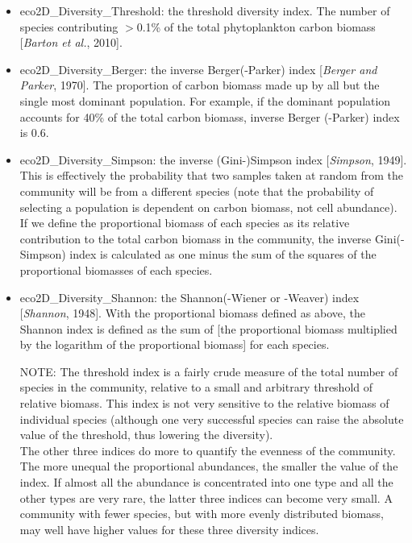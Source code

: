 \documentclass[11pt,fleqn]{book} %
\begin{document}
\begin{itemize}[noitemsep]
\begin{itemize}[noitemsep]
\item \textsf{\small eco2D\_Diversity\_Threshold}: the threshold diversity index. The number of species contributing $>$0.1\% of the total phytoplankton carbon biomass [\textit{Barton et al.}, 2010].
\item \textsf{\small eco2D\_Diversity\_Berger}: the inverse Berger(-Parker) index  [\textit{Berger and Parker}, 1970]. The proportion of carbon biomass made up by all but the single most dominant population. For example, if the dominant population accounts for 40\% of the total carbon biomass, inverse Berger (-Parker) index is 0.6. 
\item \textsf{\small eco2D\_Diversity\_Simpson}: the inverse (Gini-)Simpson index [\textit{Simpson}, 1949]. This is effectively the probability that two samples taken at random from the community will be from a different species (note that the probability of selecting a population is dependent on carbon biomass, not cell abundance). If we define the proportional biomass of each species as its relative contribution to the total carbon biomass in the community, the inverse Gini(-Simpson) index is calculated as one minus the sum of the squares of the proportional biomasses of each species.
\item \textsf{\small eco2D\_Diversity\_Shannon}: the Shannon(-Wiener or -Weaver) index  [\textit{Shannon}, 1948]. With the proportional biomass defined as above, the Shannon index is defined as the sum of [the proportional biomass multiplied by the logarithm of the proportional biomass] for each species. 
\item[NOTE:]The threshold index is a fairly crude measure of the total number of species in the community, relative to a small and arbitrary threshold of relative biomass. This index is not very sensitive to the relative biomass of individual species (although one very successful species can raise the absolute value of the threshold, thus lowering the diversity).
\\The other three indices do more to quantify the evenness of the community. The more unequal the proportional abundances, the smaller the value of the index. If almost all the abundance is concentrated into one type and all the other types are very rare, the latter three indices can become very small. A community with fewer species, but with more evenly distributed biomass, may well have higher values for these three diversity indices. 
\end{itemize}

\end{itemize}
\vspace{2mm} 
\end{document}
